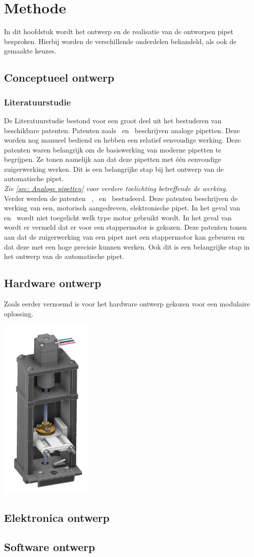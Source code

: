 \chapter{Methode}
In dit hoofdstuk wordt het ontwerp en de realisatie van de ontworpen pipet besproken. Hierbij worden de verschillende onderdelen behandeld, als ook de gemaakte keuzes.
\section{Conceptueel ontwerp}
\subsection{Literatuurstudie}
De Literatuurstudie bestond voor een groot deel uit het bestuderen van beschikbare patenten. Patenten zoals\ \cite{RN16} en\ \cite{RN17} beschrijven analoge pipetten. Deze worden nog manueel bediend en hebben een relatief eenvoudige werking. Deze patenten waren belangrijk om de basiswerking van moderne pipetten te begrijpen. Ze tonen namelijk aan dat deze pipetten met één eenvoudige zuigerwerking werken. Dit is een belangrijke stap bij het ontwerp van de automatische pipet.
\\\textit{Zie \autoref{sec: Analoge pipetten} voor verdere toelichting betreffende de werking.}
\\[12pt]Verder werden de patenten \ \cite{RN35},\ \cite{RN36} en\ \cite{RN38} bestudeerd. Deze patenten beschrijven de werking van een, motorisch aangedreven, elektronische pipet. In het geval van\ \cite{RN36} en\ \cite{RN38} wordt niet toegelicht welk type motor gebruikt wordt. In het geval van\ \cite{RN35} wordt er vermeld dat er voor een stappermotor is gekozen. Deze patenten tonen aan dat de zuigerwerking van een pipet met een stappermotor kan gebeuren en dat deze met een hoge precisie kunnen werken. Ook dit is een belangrijke stap in het ontwerp van de automatische pipet.
\section{Hardware ontwerp}
Zoals eerder vernoemd is voor het hardware ontwerp gekozen voor een modulaire oplossing.
\begin{center}
    \includegraphics[height=9cm]{figures/FullModel.png}
\end{center}
\section{Elektronica ontwerp}
\section{Software ontwerp}

